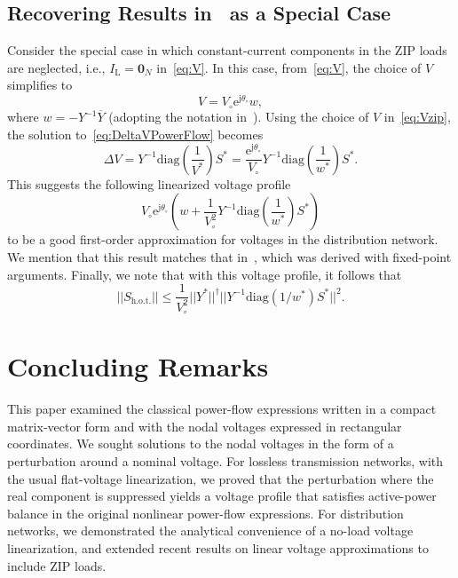 \documentclass[10 pt, conference]{ieeeconf}
\begin{document}
\subsection{Recovering Results in~\cite{Bolognani-2015} as a Special Case}
Consider the special case in which constant-current components in the $\mathrm{ZIP}$ loads are neglected, i.e., $I_\mathrm{L} = \mathbf{0}_N$ in~\eqref{eq:V}. In this case, from~\eqref{eq:V}, the choice of $V$ simplifies to
\begin{equation}
V = V_\circ \mathrm{e}^{\mathrm j \theta_\circ} w,
\label{eq:Vzip}
\end{equation}
where $w = -Y^{-1}\overline{Y}$ (adopting the notation in~\cite{Bolognani-2015}).  Using the choice of $V$ in~\eqref{eq:Vzip}, the solution to~\eqref{eq:DeltaVPowerFlow} becomes
\begin{equation*}
\Delta V = Y^{-1}\mathrm{diag}\left(\frac{1}{V^*}\right) S^* = \frac{\mathrm{e}^{\mathrm j \theta_\circ}}{V_\circ} Y^{-1}\mathrm{diag}\left(\frac{1}{w^*}\right) S^*.
\end{equation*}
This suggests the following linearized voltage profile 
\begin{equation}
V_\circ \mathrm{e}^{\mathrm j \theta_\circ} \left(w + \frac{1}{V^2_\circ} Y^{-1} \mathrm{diag}\left(\frac{1}{w^*}\right) S^* \right)
\label{eq:PQvoltage}
\end{equation}
to be a good first-order approximation for voltages in the distribution network. We mention that this result matches that in~\cite{Bolognani-2015}, which was derived with fixed-point arguments. Finally, we note that with this voltage profile, it follows that
\begin{equation}
||S_\mathrm{h.o.t.}|| \leq \frac{1}{V_\circ^2} ||Y^*||^\dagger ||Y^{-1} \mathrm{diag}\left(1/w^*\right) S^*||^2.
\end{equation}

\section{Concluding Remarks} \label{sec:Conclusions}
This paper examined the classical power-flow expressions written in a compact matrix-vector form and with the nodal voltages expressed in rectangular coordinates. We sought solutions to the nodal voltages in the form of a perturbation around a nominal voltage. For lossless transmission networks, with the usual flat-voltage linearization, we proved that the perturbation where the real component is suppressed yields a voltage profile that satisfies active-power balance in the original nonlinear power-flow expressions. For distribution networks, we demonstrated the analytical convenience of a no-load voltage linearization, and extended recent results on linear voltage approximations to include $\mathrm{ZIP}$ loads.

\balance



\end{document}
